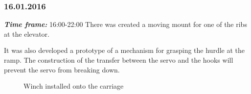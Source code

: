 \subsubsection{16.01.2016}
\textit{\textbf{Time frame:}} 16:00-22:00 \newline
There was created a moving mount for one of the ribs at the elevator.

It was also developed a prototype of a mechanism for grasping the hurdle at the ramp. The construction of the transfer between the servo and the hooks will prevent the servo from breaking down.

\begin{figure}[H]
	\begin{minipage}[h]{0.58\linewidth}
		\caption{Winch installed onto the carriage}
	\end{minipage}
	\hfill
	\begin{minipage}[h]{0.37\linewidth}

\end{minipage}
\end{figure}
